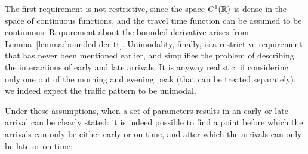 The first requirement is not restrictive,
since the space \(C^1(\mathbb{R})\) is dense in the space of continuous functions,
and the travel time function can be assumed to be continuous.
Requirement about the bounded derivative arises from Lemma~\ref{lemma:bounded-der-tt}.
Unimodality, finally, is a restrictive requirement that has never been mentioned earlier,
and simplifies the problem of describing the interactions of early and late arrivals.
It is anyway realistic:
if considering only one out of the morning and evening peak (that can be treated separately),
we indeed expect the traffic pattern to be unimodal.

Under these assumptions, when a set of parameters results in an early or late arrival can be clearly stated:
it is indeed possible to find a point before which the arrivals can only be either early or on-time,
and after which the arrivals can only be late or on-time:

